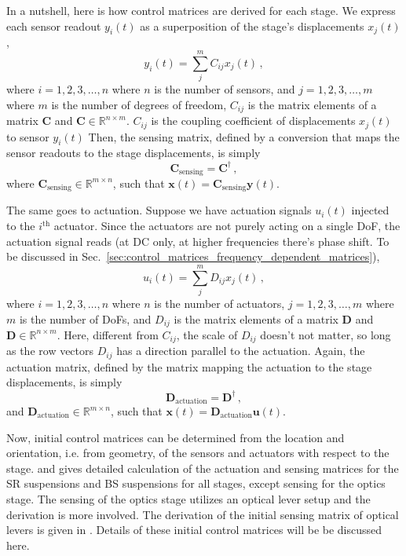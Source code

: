 In a nutshell, here is how control matrices are derived for each stage.
We express each sensor readout $y_i(t)$ as a superposition of the stage's displacements $x_j(t)$,
\begin{equation}
	y_i(t) = \sum_j^m C_{ij} x_j(t)\,,
\end{equation}
where $i=1,2,3,\dots,n$ where $n$ is the number of sensors, and $j=1,2,3,\dots,m$ where $m$ is the number of degrees of freedom, $C_{ij}$ is the matrix elements of a matrix $\mathbf{C}$ and $\mathbf{C}\in \mathbb{R}^{n\times m}$.
$C_{ij}$ is the coupling coefficient of displacements $x_j(t)$ to sensor  $y_i(t)$
Then, the sensing matrix, defined by a conversion that maps the sensor readouts to the stage displacements, is simply
\begin{equation}
	\mathbf{C}_{\mathrm{sensing}} = \mathbf{C}^{\dagger}\,,
\end{equation}
where $\mathbf{C}_\mathrm{sensing} \in \mathbb{R}^{m\times n}$, such that $\mathbf{x}(t) = \mathbf{C}_\mathrm{sensing}\mathbf{y}(t)$.

The same goes to actuation.
Suppose we have actuation signals $u_i(t)$ injected to the $i^\mathrm{th}$ actuator.
Since the actuators are not purely acting on a single DoF, the actuation signal reads (at DC only, at higher frequencies there's phase shift. To be discussed in Sec.~\ref{sec:control_matrices_frequency_dependent_matrices}),
\begin{equation}
	u_i(t) = \sum_j^m D_{ij} x_j(t)\,,
\end{equation}
where $i=1,2,3,\dots,n$ where $n$ is the number of actuators, $j=1,2,3,\dots,m$ where $m$ is the number of DoFs, and $D_{ij}$ is the matrix elements of a matrix $\mathbf{D}$ and $\mathbf{D}\in \mathbb{R}^{n\times m}$.
Here, different from $C_{ij}$, the scale of $D_{ij}$ doesn't not matter, so long as the row vectors $D_{ij}$ has a direction parallel to the actuation.
Again, the actuation matrix, defined by the matrix mapping the actuation to the stage displacements, is simply
\begin{equation}
	\mathbf{D}_\mathrm{actuation} = \mathbf{D}^{\dagger}\,,
\end{equation}
and $\mathbf{D}_\mathrm{actuation}\in\mathbb{R}^{m\times n}$, such that $\mathbf{x}(t) = \mathbf{D}_\mathrm{actuation}\mathbf{u}(t)$.

Now, initial control matrices can be determined from the location and orientation, i.e. from geometry, of the sensors and actuators with respect to the stage.
\cite{sr_suspension_diagonalization} and \cite{bs_suspension_diagonalization} gives detailed calculation of the actuation and sensing matrices for the SR suspensions and BS suspensions for all stages, except sensing for the optics stage.
The sensing of the optics stage utilizes an optical lever setup and the derivation is more involved.
The derivation of the initial sensing matrix of optical levers is given in \cite{sensing_matrices_oplev}.
Details of these initial control matrices will be be discussed here.

